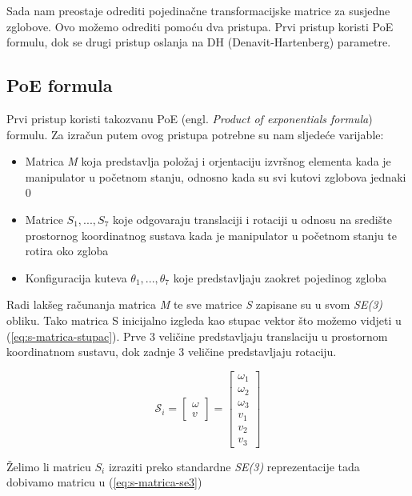 \documentclass[times, utf8, diplomskirad]{fer}
\begin{document}
Sada nam preostaje odrediti pojedinačne transformacijske matrice za susjedne zglobove.
Ovo možemo odrediti pomoću dva pristupa.
Prvi pristup koristi PoE formulu, dok se drugi pristup oslanja na DH (Denavit-Hartenberg) parametre.
\subsection{PoE formula}
Prvi pristup koristi takozvanu PoE (engl. \textit{Product of exponentials formula}) formulu.
Za izračun putem ovog pristupa potrebne su nam sljedeće varijable:
\begin{itemize}
    \item Matrica \textit{M} koja predstavlja položaj i orjentaciju izvršnog elementa kada je manipulator u početnom stanju, odnosno kada su svi kutovi zglobova jednaki 0
    \item Matrice \textit{$S_1, ..., S_7$} koje odgovaraju translaciji i rotaciji u odnosu na središte prostornog koordinatnog sustava kada je manipulator u početnom stanju te rotira oko zgloba
    \item Konfiguracija kuteva \textit{$\theta_1, ..., \theta_7$} koje predstavljaju zaokret pojedinog zgloba
\end{itemize}
\newpage
Radi lakšeg računanja matrica \textit{M} te sve matrice \textit{S} zapisane su u svom \textit{SE(3)} obliku.
Tako matrica S inicijalno izgleda kao stupac vektor što možemo vidjeti u (\ref{eq:s-matrica-stupac}).
Prve 3 veličine predstavljaju translaciju u prostornom koordinatnom sustavu, dok zadnje 3 veličine predstavljaju rotaciju.

\begin{equation}
    \mathcal{S}_i=\left[\begin{array}{c}
    \omega \\
    v
    \end{array}\right]=\left[\begin{array}{c}
    \omega_1 \\
    \omega_2 \\
    \omega_3 \\
    v_1 \\
    v_2 \\
    v_3
    \end{array}\right]
    \label{eq:s-matrica-stupac}
\end{equation}

Želimo li matricu \textit{$S_i$} izraziti preko standardne \textit{SE(3)} reprezentacije tada dobivamo matricu u (\ref{eq:s-matrica-se3})
\end{document}
